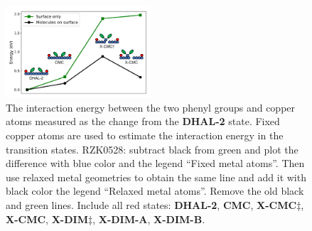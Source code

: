 \documentclass[%
 reprint,
 amsmath,amssymb,
 aps,
prb,
floatfix,
]{revtex4-2}
\newcommand{\comm}{\color{Purple}} %
\begin{document}
\begin{figure}[hbt]
\centering
\includegraphics[width=0.48\textwidth]{Fig/onlysurface.pdf}
\caption{
The interaction energy between the two phenyl groups and copper atoms measured as the change from the \textbf{DHAL-2} state. Fixed copper atoms are used to estimate the interaction energy in the transition states. {\comm RZK0528: subtract black from green and plot the difference with blue color and the legend ``Fixed metal atoms''. Then use relaxed metal geometries to obtain the same line and add it with black color the legend ``Relaxed metal atoms''. Remove the old black and green lines. Include all red states: \textbf{DHAL-2}, \textbf{CMC}, \textbf{X-CMC$\ddagger$}, \textbf{X-CMC}, \textbf{X-DIM$\ddagger$}, \textbf{X-DIM-A}, \textbf{X-DIM-B}.}
}
\label{fig:onlysurface}
\end{figure}
\end{document}
